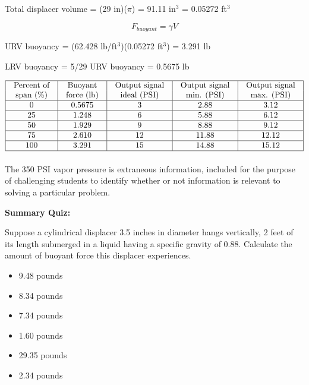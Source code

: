 





Total displacer volume = (29 in)($\pi$) = 91.11 in$^{3}$ = 0.05272 ft$^{3}$

$$F_{buoyant} = \gamma V$$

URV buoyancy = (62.428 lb/ft$^{3}$)(0.05272 ft$^{3}$) = 3.291 lb

LRV buoyancy = 5/29 URV buoyancy = 0.5675 lb


$$\vbox{\offinterlineskip
\halign{\strut
\vrule \quad\hfil # \ \hfil & 
\vrule \quad\hfil # \ \hfil & 
\vrule \quad\hfil # \ \hfil & 
\vrule \quad\hfil # \ \hfil & 
\vrule \quad\hfil # \ \hfil \vrule \cr
\noalign{\hrule}
%
Percent of & Buoyant & Output signal & Output signal & Output signal \cr
%
span (\%) & force (lb) & ideal (PSI) & min. (PSI) & max. (PSI) \cr
%
\noalign{\hrule}
%
0 & 0.5675 & 3 & 2.88 & 3.12 \cr
%
\noalign{\hrule}
%
25 & 1.248 & 6 & 5.88 & 6.12 \cr
%
\noalign{\hrule}
%
50 & 1.929 & 9 & 8.88 & 9.12 \cr
%
\noalign{\hrule}
%
75 & 2.610 & 12 & 11.88 & 12.12 \cr
%
\noalign{\hrule}
%
100 & 3.291 & 15 & 14.88 & 15.12 \cr
%
\noalign{\hrule}
} %
}$$ %

\vskip 10pt

The 350 PSI vapor pressure is extraneous information, included for the purpose of challenging students to identify whether or not information is relevant to solving a particular problem.

















\vfil \eject

\noindent
{\bf Summary Quiz:}

Suppose a cylindrical displacer 3.5 inches in diameter hangs vertically, 2 feet of its length submerged in a liquid having a specific gravity of 0.88.  Calculate the amount of buoyant force this displacer experiences.

\begin{itemize}
\item{} 9.48 pounds
\vskip 5pt 
\item{} 8.34 pounds
\vskip 5pt 
\item{} 7.34 pounds
\vskip 5pt 
\item{} 1.60 pounds
\vskip 5pt 
\item{} 29.35 pounds
\vskip 5pt 
\item{} 2.34 pounds
\end{itemize}





